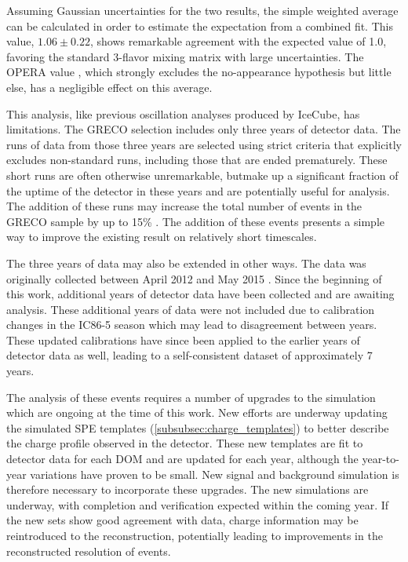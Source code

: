 Assuming Gaussian uncertainties for the two results, the simple weighted average can be calculated in order to estimate the expectation from a combined fit.
This value, ${1.06\pm0.22}$, shows remarkable agreement with the expected value of 1.0, favoring the standard 3-flavor mixing matrix with large uncertainties.
The OPERA value , which strongly excludes the no-appearance hypothesis but little else, has a negligible effect on this average.

This analysis, like previous oscillation analyses produced by IceCube, has limitations.
The GRECO selection includes only three years of detector data.
The runs of data from those three years are selected using strict criteria that explicitly excludes non-standard runs, including those that are ended prematurely.
These short runs are often otherwise unremarkable, butmake up a significant fraction of the uptime of the detector in these years and are potentially useful for analysis.
The addition of these runs may increase the total number of events in the GRECO sample by up to 15\% .
The addition of these events presents a simple way to improve the existing result on relatively short timescales.

The three years of data may also be extended in other ways.
The data was originally collected between April 2012 and May 2015 .
Since the beginning of this work, additional years of detector data have been collected and are awaiting analysis.
These additional years of data were not included due to calibration changes in the IC86-5 season which may lead to disagreement between years.
These updated calibrations have since been applied to the earlier years of detector data as well, leading to a self-consistent dataset of approximately 7 years.

The analysis of these events requires a number of upgrades to the simulation which are ongoing at the time of this work.
New efforts are underway updating the simulated SPE templates (\ref{subsubsec:charge_templates}) to better describe the charge profile observed in the detector.
These new templates are fit to detector data for each DOM and are updated for each year, although the year-to-year variations have proven to be small.
New signal and background simulation is therefore necessary to incorporate these upgrades.
The new simulations are underway, with completion and verification expected within the coming year.
If the new sets show good agreement with data, charge information may be reintroduced to the reconstruction, potentially leading to improvements in the reconstructed resolution of events.


